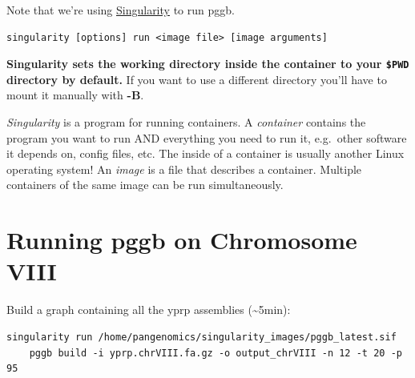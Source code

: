 \documentclass[
]{book}
\begin{document}
Note that we're using \href{https://sylabs.io/guides/main/user-guide}{Singularity} to run pggb.

\begin{verbatim}
singularity [options] run <image file> [image arguments]
\end{verbatim}

\textbf{Singularity sets the working directory inside the container to your \texttt{\$PWD} directory by default.} If you want to use a different directory you'll have to mount it manually with \textbf{-B}.

\emph{Singularity} is a program for running containers. A \emph{container} contains the program you want to run AND everything you need to run it, e.g.~other software it depends on, config files, etc. The inside of a container is usually another Linux operating system! An \emph{image} is a file that describes a container. Multiple containers of the same image can be run simultaneously.

\hypertarget{running-pggb-on-chromosome-viii}{%
\section{Running pggb on Chromosome VIII}\label{running-pggb-on-chromosome-viii}}

Build a graph containing all the yprp assemblies (\textasciitilde5min):

\begin{verbatim}
singularity run /home/pangenomics/singularity_images/pggb_latest.sif
    pggb build -i yprp.chrVIII.fa.gz -o output_chrVIII -n 12 -t 20 -p 95
\end{verbatim}
\end{document}
